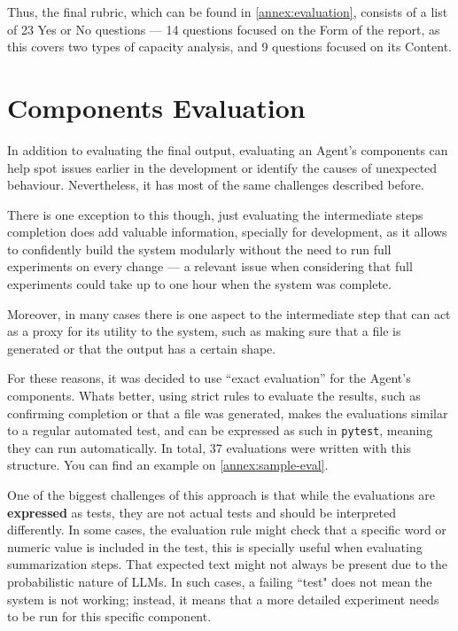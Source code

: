 \documentclass[a4paper]{report}
\begin{document}
Thus, the final rubric, which can be found in \autoref{annex:evaluation}, consists of a list of 23 Yes or No questions --- 14 questions focused on the Form of the report, as this covers two types of capacity analysis, and 9 questions focused on its Content.

\section{Components Evaluation}
\label{sec:components-evals}

In addition to evaluating the final output, evaluating an Agent's components can help spot issues earlier in the development or identify the causes of unexpected behaviour. Nevertheless, it has most of the same challenges described before.

There is one exception to this though, just evaluating the intermediate steps completion does add valuable information, specially for development, as it allows to confidently build the system modularly without the need to run full experiments on every change --- a relevant issue when considering that full experiments could take up to one hour when the system was complete.

Moreover, in many cases there is one aspect to the intermediate step that can act as a proxy for its utility to the system, such as making sure that a file is generated or that the output has a certain shape.

For these reasons, it was decided to use ``exact evaluation'' for the Agent's components. Whats better, using strict rules to evaluate the results, such as confirming completion or that a file was generated, makes the evaluations similar to a regular automated test, and can be expressed as such in \texttt{pytest}, meaning they can run automatically. In total, 37 evaluations were written with this structure. You can find an example on \autoref{annex:sample-eval}.

One of the biggest challenges of this approach is that while the evaluations are \textbf{expressed} as tests, they are not actual tests and should be interpreted differently. In some cases, the evaluation rule might check that a specific word or numeric value is included in the test, this is specially useful when evaluating summarization steps. That expected text might not always be present due to the probabilistic nature of LLMs. In such cases, a failing ``test" does not mean the system is not working; instead, it means that a more detailed experiment needs to be run for this specific component.
\end{document}
